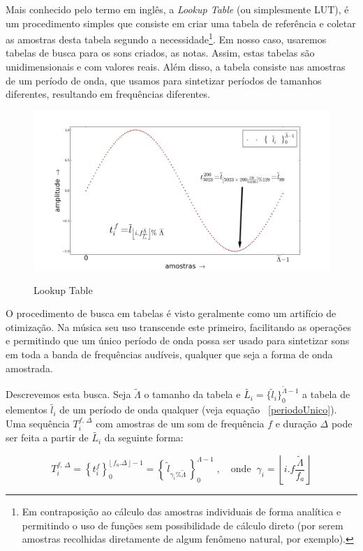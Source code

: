 Mais conhecido pelo termo em inglês, a \emph{Lookup Table} (ou simplesmente
LUT), é um procedimento simples que consiste em criar uma tabela
de referência e coletar as amostras desta tabela segundo a 
necessidade\footnote{Em contraposição ao cálculo das amostras individuais
de forma analítica e permitindo o uso de funções sem possibilidade de cálculo direto
(por serem amostras recolhidas diretamente de algum fenômeno natural, por exemplo).}. Em nosso caso, usaremos tabelas de busca para os
sons criados, as notas. Assim, estas tabelas são unidimensionais e com
valores reais. Além disso, a tabela consiste nas amostras
de um período de onda, que usamos para sintetizar períodos
de tamanhos diferentes, resultando em frequências diferentes.

\begin{figure}[h!]
    \centering
    \caption{Lookup Table}
        \includegraphics[width=\textwidth]{figuras/lut}
        \label{fig:lut}
\end{figure}

O procedimento de busca em tabelas é visto geralmente como um
artifício de otimização. Na música seu uso transcende este
primeiro, facilitando as operações e permitindo que um único
período de onda possa ser usado para sintetizar sons em toda a banda
de frequências audíveis, qualquer que seja a forma de onda amostrada.

Descrevemos esta busca. Seja $\widetilde{\Lambda}$ o tamanho 
da tabela e $\widetilde{L_i} = \{ \widetilde{l}_i \}_0^{\widetilde{\Lambda} -1}$ a tabela de elementos $\widetilde{l_i}$ de um
período de onda qualquer (veja equação ~\ref{periodoUnico}). Uma sequência
$T_i^{f,\,\Delta}$ com amostras de um som de frequência $f$ e duração $\Delta$
pode ser feita a partir de $\widetilde{L_i}$ da seguinte forma:

\begin{equation}
T_i^{f,\,\Delta}=\left\{t_i^f\right\}_0^{\lfloor \, f_a . \Delta \, \rfloor -1} = \left\{ \, \widetilde{l}_{\gamma_i \% \widetilde{\Lambda} }\, \right\}_{0}^{\Lambda-1}\; , \quad \text{onde} \;\; \gamma_i = \left \lfloor i . f \frac{ \widetilde{\Lambda}}{f_a} \right \rfloor  
\end{equation}


